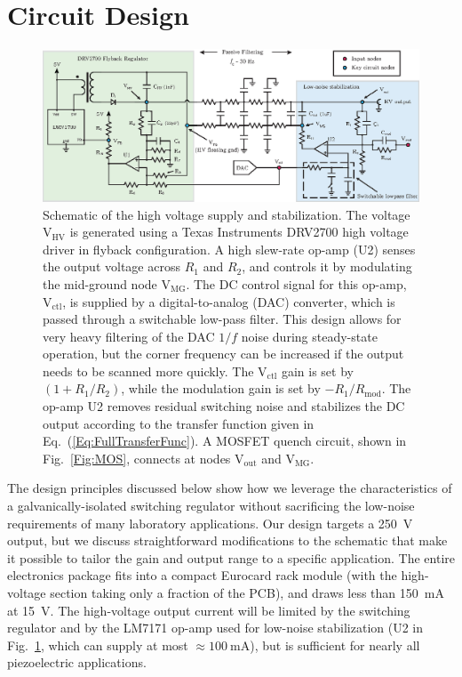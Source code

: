 \documentclass[aip,rsi,reprint]{revtex4-1} %
\begin{document}
\section{Circuit Design}
\label{Sec:Circuit}

\begin{figure}[t]
\includegraphics[width=\textwidth]{Schematic}
\caption{Schematic of the high voltage supply and stabilization.
The voltage $\text{V}_\text{HV}$ is generated using a Texas Instruments DRV2700 high voltage driver in flyback configuration.
A high slew-rate op-amp (U2) senses the output voltage across $R_1$ and $R_2$, and controls it by modulating the mid-ground node $\text{V}_\text{MG}$.
The DC control signal for this op-amp,  $\text{V}_{\text{ctl}}$, is supplied by a digital-to-analog (DAC) converter, which is passed through a switchable low-pass filter. 
This design allows for very heavy filtering of the DAC $1/f$ noise during steady-state operation, but the corner frequency can be increased if the output needs to be scanned more quickly.
The $\text{V}_{\text{ctl}}$ gain is set by $\left(1+R_1/R_2\right)$, while the modulation gain is set by $-R_1/R_\text{mod}$.
The op-amp U2 removes residual switching noise and stabilizes the DC output according to the transfer function given in Eq.~(\ref{Eq:FullTransferFunc}).
A MOSFET quench circuit, shown in Fig.~\ref{Fig:MOS}, connects at nodes $\text{V}_\text{out}$ and $\text{V}_\text{MG}$.
\label{Fig:PiezoCircuit}}
\end{figure}

The design principles discussed below show how we leverage the characteristics of a galvanically-isolated switching regulator without sacrificing the low-noise requirements of many laboratory applications.
Our design targets a \SI{250}{\volt} output, but we discuss straightforward modifications to the schematic that make it possible to tailor the gain and output range to a specific application.
The entire electronics package fits into a compact Eurocard rack module (with the high-voltage section taking only a fraction of the PCB), and draws less than \SI{150}{\milli\ampere} at \SI{15}{\volt}.
The high-voltage output current will be limited by the switching regulator and by the LM7171 op-amp used for low-noise stabilization (U2 in Fig.~\ref{Fig:PiezoCircuit}, which can supply at most $\approx\SI{100}{\milli\ampere}$\cite{LM7171Datasheet}), but is sufficient for nearly all piezoelectric applications.
\end{document}
